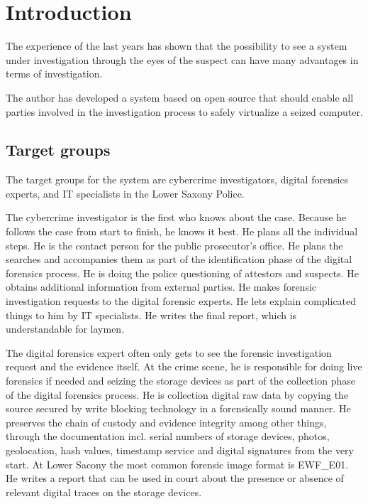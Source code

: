\chapter{Introduction}

The experience of the last years has shown that the possibility to see a system under investigation through the eyes of the suspect can have many advantages in terms of investigation.

The author has developed a system based on open source that should enable all parties involved in the investigation process to safely virtualize a seized computer.

\section{Target groups}

The target groups for the system are cybercrime investigators, digital forensics experts, and IT specialists in the Lower Saxony Police.

The cybercrime investigator is the first who knows about the case. Because he follows the case from start to finish, he knows it best. He plans all the individual steps. He is the contact person for the public prosecutor's office. He plans the searches and accompanies them as part of the identification phase of the digital forensics process. \cite{Aarnes2017:16} %
He is doing the police questioning of attestors and suspects. He obtains additional information from external parties. He makes forensic investigation requests to the digital forensic experts. He lets explain complicated things to him by IT specialists. He writes the final report, which is understandable for laymen.

The digital forensics expert often only gets to see the forensic investigation request and the evidence itself. At the crime scene, he is responsible for doing live forensics if needed and seizing the storage devices as part of the collection phase of the digital forensics process. He is collection digital raw data by copying the source secured by write blocking technology in a forensically sound manner. \cite{Aarnes2017:16} %
He preserves the chain of custody and evidence integrity among other things, through the documentation incl. serial numbers of storage devices, photos, geolocation, hash values, timestamp service and digital signatures from the very start. \cite{Aarnes2017:23} %
At Lower Sacony the most common forensic image format is EWF\_E01.
He writes a report that can be used in court about the presence or absence of relevant digital traces on the storage devices.


